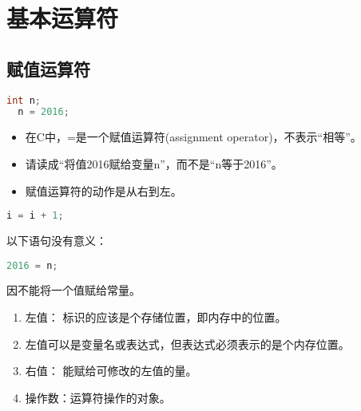 \section{基本运算符}

\subsection{赋值运算符}
\begin{frame}[fragile]\ft{\subsecname}
\begin{lstlisting}[language=c,backgroundcolor=\color{red!10}]
  int n; 
  n = 2016;
\end{lstlisting} \pause 

\begin{itemize}
\item \tf 在C中，=是一个赋值运算符(assignment operator)，不表示“相等”。\\[0.15in]
\item 请读成“将值2016赋给变量n”，而不是“n等于2016”。\\[0.15in]
\item 赋值运算符的动作是从右到左。
\end{itemize}

\end{frame}

\begin{frame}[fragile]\ft{\subsecname}
\begin{lstlisting}[language=c,backgroundcolor=\color{red!10}]
  i = i + 1;
\end{lstlisting} \pause 
\begin{figure}
\centering
{}
\end{figure}
\end{frame}

\begin{frame}[fragile]\ft{\subsecname}
以下语句没有意义：
\begin{lstlisting}[language=c,backgroundcolor=\color{red!10}]
  2016 = n;
\end{lstlisting} 	
因不能将一个值赋给常量。
\end{frame}

\begin{frame}[fragile]\ft{\subsecname}
\begin{enumerate}
\item 左值： 标识的应该是个存储位置，即内存中的位置。\\[0.4cm]
\item[] 左值可以是变量名或表达式，但表达式必须表示的是个内存位置。\\[0.4cm]
\item 右值： 能赋给可修改的左值的量。\\[0.4cm]
\item 操作数：运算符操作的对象。
\end{enumerate}
\end{frame}


